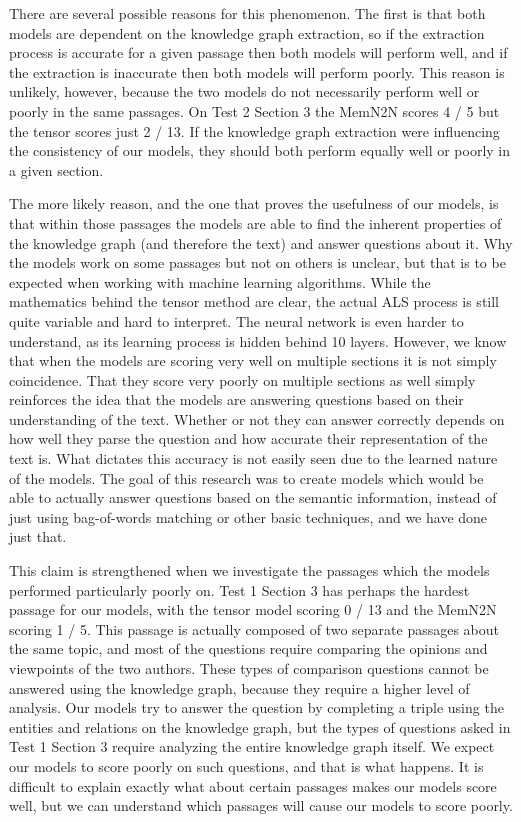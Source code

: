 \documentclass[pageno]{final_paper}
\begin{document}
There are several possible reasons for this phenomenon. The first is that both
models are dependent on the knowledge graph extraction, so if the extraction
process is accurate for a given passage then both models will perform well, and
if the extraction is inaccurate then both models will perform poorly. This
reason is unlikely, however, because the two models do not necessarily perform
well or poorly in the same passages. On Test 2 Section 3 the MemN2N scores 4 / 5
but the tensor scores just 2 / 13. If the knowledge graph extraction were
influencing the consistency of our models, they should both perform equally well
or poorly in a given section.

The more likely reason, and the one that proves the usefulness of our models, is
that within those passages the models are able to find the inherent properties
of the knowledge graph (and therefore the text) and answer questions about it.
Why the models work on some passages but not on others is unclear, but that is
to be expected when working with machine learning algorithms. While the
mathematics behind the tensor method are clear, the actual ALS process is still
quite variable and hard to interpret. The neural network is even harder to
understand, as its learning process is hidden behind 10 layers. However, we know
that when the models are scoring very well on multiple sections it is not simply
coincidence. That they score very poorly on multiple sections as well simply
reinforces the idea that the models are answering questions based on their
understanding of the text. Whether or not they can answer correctly depends on
how well they parse the question and how accurate their representation of the
text is. What dictates this accuracy is not easily seen due to the learned
nature of the models. The goal of this research was to create models which would
be able to actually answer questions based on the semantic information, instead
of just using bag-of-words matching or other basic techniques, and we have done
just that.

This claim is strengthened when we investigate the passages which the models
performed particularly poorly on. Test 1 Section 3 has perhaps the hardest
passage for our models, with the tensor model scoring 0 / 13 and the MemN2N
scoring 1 / 5. This passage is actually composed of two separate passages about
the same topic, and most of the questions require comparing the opinions and
viewpoints of the two authors. These types of comparison questions cannot be
answered using the knowledge graph, because they require a higher level of
analysis. Our models try to answer the question by completing a triple using the
entities and relations on the knowledge graph, but the types of questions asked
in Test 1 Section 3 require analyzing the entire knowledge graph itself. We
expect our models to score poorly on such questions, and that is what happens.
It is difficult to explain exactly what about certain passages makes our models
score well, but we can understand which passages will cause our models to score
poorly.
\end{document}
